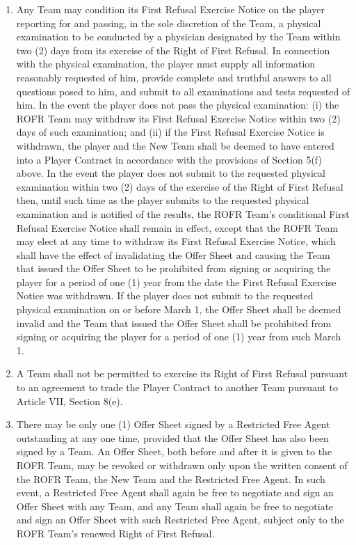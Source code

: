 \documentclass[
]{book}
\begin{document}
\begin{enumerate}
\item
  Any Team may condition its First Refusal Exercise Notice on the player reporting for and passing, in the sole discretion of the Team, a physical examination to be conducted by a physician designated by the Team within two (2) days from its exercise of the Right of First Refusal. In connection with the physical examination, the player must supply all information reasonably requested of him, provide complete and truthful answers to all questions posed to him, and submit to all examinations and tests requested of him. In the event the player does not pass the physical examination: (i) the ROFR Team may withdraw its First Refusal Exercise Notice within two (2) days of such examination; and (ii) if the First Refusal Exercise Notice is withdrawn, the player and the New Team shall be deemed to have entered into a Player Contract in accordance with the provisions of Section 5(f) above. In the event the player does not submit to the requested physical examination within two (2) days of the exercise of the Right of First Refusal then, until such time as the player submits to the requested physical examination and is notified of the results, the ROFR Team's conditional First Refusal Exercise Notice shall remain in effect, except that the ROFR Team may elect at any time to withdraw its First Refusal Exercise Notice, which shall have the effect of invalidating the Offer Sheet and causing the Team that issued the Offer Sheet to be prohibited from signing or acquiring the player for a period of one (1) year from the date the First Refusal Exercise Notice was withdrawn. If the player does not submit to the requested physical examination on or before March 1, the Offer Sheet shall be deemed invalid and the Team that issued the Offer Sheet shall be prohibited from signing or acquiring the player for a period of one (1) year from such March 1.
\item
  A Team shall not be permitted to exercise its Right of First Refusal pursuant to an agreement to trade the Player Contract to another Team pursuant to Article VII, Section 8(e).
\item
  There may be only one (1) Offer Sheet signed by a Restricted Free Agent outstanding at any one time, provided that the Offer Sheet has also been signed by a Team. An Offer Sheet, both before and after it is given to the ROFR Team, may be revoked or withdrawn only upon the written consent of the ROFR Team, the New Team and the Restricted Free Agent. In such event, a Restricted Free Agent shall again be free to negotiate and sign an Offer Sheet with any Team, and any Team shall again be free to negotiate and sign an Offer Sheet with such Restricted Free Agent, subject only to the ROFR Team's renewed Right of First Refusal.

\end{enumerate}
\end{document}
